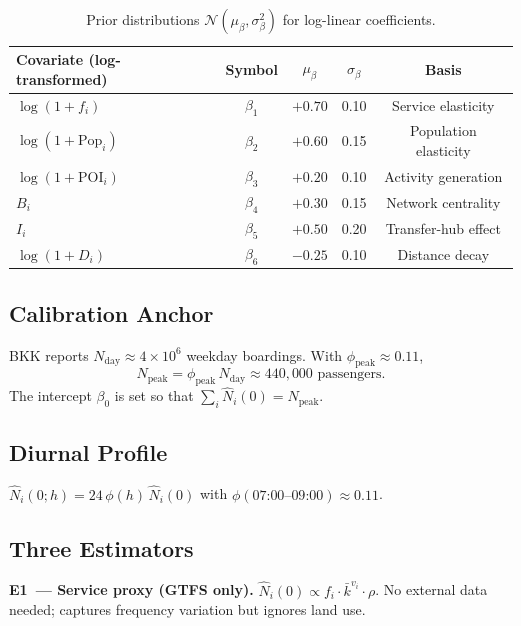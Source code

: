 \documentclass[11pt,a4paper]{article}
\theoremstyle{plain}
\theoremstyle{definition}
\theoremstyle{remark}
\begin{document}
\begin{table}[h]
\centering
\caption{Prior distributions $\mathcal{N}(\mu_\beta,\sigma_\beta^2)$ for
  log-linear coefficients.}
\label{tab:priors}
\begin{tabular}{lcccc}
\toprule
Covariate (log-transformed) & Symbol & $\mu_\beta$ & $\sigma_\beta$ & Basis \\
\midrule
$\log(1+f_i)$                & $\beta_1$ & $+0.70$ & 0.10 & Service elasticity \cite{schiewe2022} \\
$\log(1+\mathrm{Pop}_i)$    & $\beta_2$ & $+0.60$ & 0.15 & Population elasticity \\
$\log(1+\mathrm{POI}_i)$    & $\beta_3$ & $+0.20$ & 0.10 & Activity generation \\
$B_i$                        & $\beta_4$ & $+0.30$ & 0.15 & Network centrality \\
$I_i$                        & $\beta_5$ & $+0.50$ & 0.20 & Transfer-hub effect \\
$\log(1+D_i)$                & $\beta_6$ & $-0.25$ & 0.10 & Distance decay \\
\bottomrule
\end{tabular}
\end{table}

\subsection{Calibration Anchor}

BKK reports $N_{\mathrm{day}}\approx4\times10^6$ weekday boardings.
With $\phi_{\mathrm{peak}}\approx0.11$,
\begin{equation}
  N_{\mathrm{peak}}=\phi_{\mathrm{peak}}\,N_{\mathrm{day}}\approx440{,}000\text{ passengers.}
\end{equation}
The intercept $\beta_0$ is set so that $\sum_i\hat{N}_i(0)=N_{\mathrm{peak}}$.

\subsection{Diurnal Profile}

$\hat{N}_i(0;h)=24\,\phi(h)\,\hat{N}_i(0)$ with
$\phi(07\text{:}00\text{--}09\text{:}00)\approx0.11$.

\subsection{Three Estimators}

\textbf{E1~--- Service proxy (GTFS only).}
$\hat{N}_i(0)\propto f_i\cdot\bar{k}^{v_i}\cdot\rho$.
No external data needed; captures frequency variation but ignores land use.
\end{document}
